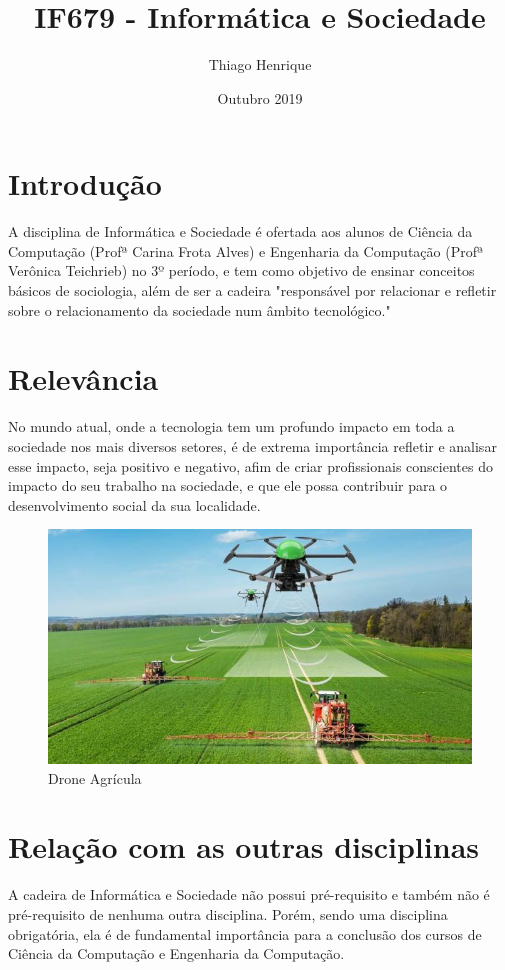 \documentclass[a4 paper, 10pt]{article}
\title{IF679 - Informática e Sociedade}
\author{Thiago Henrique}
\date{Outubro 2019}
\begin{document}
\maketitle

\section{Introdução}
A disciplina de Informática e Sociedade é ofertada aos alunos de Ciência da Computação (Profª Carina Frota Alves) e Engenharia da Computação (Profª Verônica Teichrieb) no 3º período, e tem como objetivo de ensinar conceitos básicos de sociologia, além de ser a cadeira "responsável por relacionar e refletir sobre o relacionamento da sociedade num âmbito tecnológico." \cite{sitepet}

\section{Relevância}
No mundo atual, onde a tecnologia tem um profundo impacto em toda a sociedade nos mais diversos setores, é de extrema importância refletir e analisar esse impacto, seja positivo e negativo, afim de criar profissionais conscientes do impacto do seu trabalho na sociedade, e que ele possa contribuir para o desenvolvimento social da sua localidade.

\begin{figure}[h!]
\centering
\includegraphics[scale=0.4]{drone-agricola.jpg}
\caption{Drone Agrícula \cite{drone}}
\label{fig:drone-agricola.jpg}
\end{figure}

\section{Relação com as outras disciplinas}
A cadeira de Informática e Sociedade não possui pré-requisito e também não é pré-requisito de nenhuma outra disciplina.\cite{perfil}  Porém, sendo uma disciplina obrigatória, ela é de fundamental importância para a conclusão dos cursos de Ciência da Computação e Engenharia da Computação.



\end{document}
